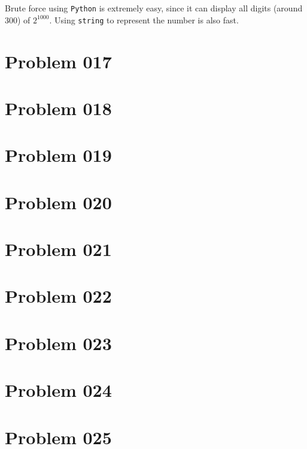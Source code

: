 \begin{sol}
Brute force using \texttt{Python} is extremely easy, since it can display all digits (around 300) of $2^{1000}$. Using \texttt{string} to represent the number is also fast.
\end{sol}
\section{Problem 017}
\begin{prob}
\end{prob}
\section{Problem 018}
\begin{prob}
\end{prob}
\section{Problem 019}
\begin{prob}
\end{prob}
\section{Problem 020}
\begin{prob}
\end{prob}
\section{Problem 021}
\begin{prob}
\end{prob}
\section{Problem 022}
\begin{prob}
\end{prob}
\section{Problem 023}
\begin{prob}
\end{prob}
\section{Problem 024}
\begin{prob}
\end{prob}
\section{Problem 025}
\begin{prob}
\end{prob}